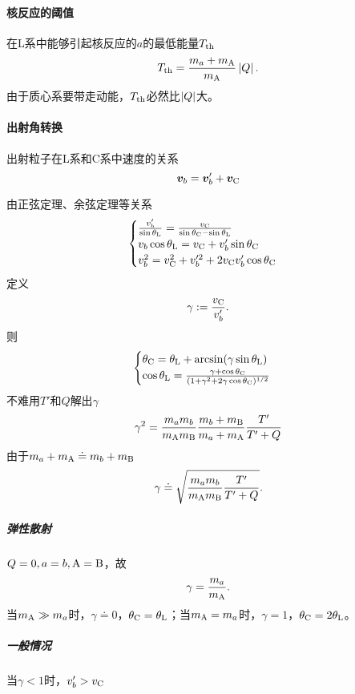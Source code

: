 \paragraph{核反应的阈值}
在L系中能够引起核反应的$a$的最低能量$T_{\mathrm{th}}$
\begin{align}
	T_{\mathrm{th}}=\frac{m_a+m_{\mathrm{A}}}{m_{\mathrm{A}}}\left\lvert Q\right\rvert.
\end{align}
由于质心系要带走动能，$T_{\mathrm{th}}$必然比$\left\lvert Q\right\rvert$大。
\paragraph{出射角转换}
出射粒子在L系和C系中速度的关系
\[
	\bm v_b=\bm v'_b+\bm v_{\mathrm C}
\]
\begin{center}
\end{center}
由正弦定理、余弦定理等关系
\[
	\begin{cases}
		\frac{v_b'}{\sin\theta_{\mathrm L}}=\frac{v_{\mathrm C}}{\sin\theta_{\mathrm C}-\sin\theta_{\mathrm L}}\\
		v_b\cos\theta_{\mathrm L}=v_{\mathrm C}+v_b'\sin\theta_{\mathrm C}\\
		v_b^2=v_{\mathrm C}^2+v_b'^2+2v_{\mathrm C} v_b'\cos\theta_{\mathrm C}
	\end{cases}
\]
定义
\begin{align}
	\gamma:=\frac{v_{\mathrm C}}{v_b'}.
\end{align}
则
\begin{align}
	\begin{cases}
		\theta_{\mathrm C}=\theta_{\mathrm L}+\arcsin(\gamma\sin\theta_{\mathrm L})\\
		\cos\theta_{\mathrm L}=\frac{\gamma+\cos\theta_{\mathrm C}}{(1+\gamma^2+2\gamma\cos\theta_{\mathrm C})^{1/2}}
	\end{cases}
\end{align}
不难用$T'$和$Q$解出$\gamma$
\[
	\gamma^2=\frac{m_am_b}{m_{\mathrm{A}}m_{\mathrm{B}}}\frac{m_b+m_{\mathrm{B}}}{m_a+m_{\mathrm{A}}}\frac{T'}{T'+Q}
\]
由于$m_a+m_{\mathrm{A}}\doteq m_b+m_{\mathrm{B}}$
\begin{align}
	\gamma\doteq\sqrt{\frac{m_am_b}{m_{\mathrm{A}}m_{\mathrm{B}}}\frac{T'}{T'+Q}}.
\end{align}
\subparagraph{弹性散射}$Q=0,a=b,\mathrm{A}=\mathrm{B}$，故 
\[
	\gamma=\frac{m_a}{m_{\mathrm{A}}}.
\]
当$m_{\mathrm{A}}\gg m_a$时，$\gamma\doteq 0$，$\theta_{\mathrm C}=\theta_{\mathrm L}$；当$m_{\mathrm{A}}= m_a$时，$\gamma=1$，$\theta_{\mathrm C}=2\theta_{\mathrm L}$。
\subparagraph{一般情况}当$\gamma<1$时，$v_b'>v_{\mathrm C}$

